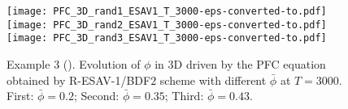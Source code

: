 \documentclass[final,review,onefignum,onetabnum]{siamart190516}
\theoremstyle{plain}
\begin{document}


\begin{figure}[htbp]
\centering
	\texttt{[image: PFC\_3D\_rand1\_ESAV1\_T\_3000-eps-converted-to.pdf]}\hspace{-9mm}
	\texttt{[image: PFC\_3D\_rand2\_ESAV1\_T\_3000-eps-converted-to.pdf]}\hspace{-9mm}
	\texttt{[image: PFC\_3D\_rand3\_ESAV1\_T\_3000-eps-converted-to.pdf]}
\label{Fig:PFC-3D-rand-ESAV1}
\caption{Example 3 (). Evolution of $\phi$ in $3$D driven by the PFC equation obtained by R-ESAV-1/BDF$2$ scheme with different $\bar \phi$ at $T=3000$. First: $\bar{\phi}=0.2$; Second: $\bar{\phi}=0.35$; Third: $\bar{\phi}=0.43$.}
\end{figure}
\end{document}
